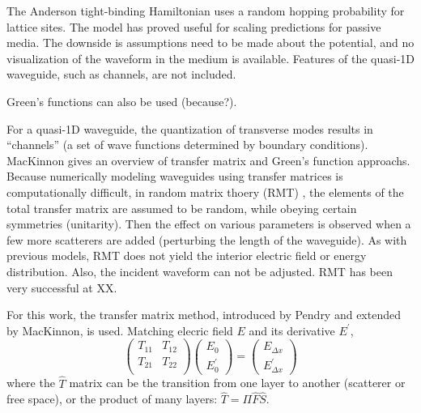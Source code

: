 The Anderson tight-binding Hamiltonian \cite{1958_Anderson} uses a random hopping probability for lattice sites. The model has proved useful for scaling predictions for passive media. The downside is assumptions need to be made about the potential, and no visualization of the waveform in the medium is available. Features of the quasi-1D waveguide, such as channels, are not included.

Green's functions can also be used (because?).

For a quasi-1D waveguide, the quantization of transverse modes results in ``channels'' (a set of wave functions determined by boundary conditions).  MacKinnon \cite{2003_Kettemann} gives an overview of transfer matrix and Green's function approachs. Because numerically modeling waveguides using transfer matrices is computationally difficult, in random matrix thoery (RMT)\cite{1951_Wigner} %
\cite{1997_Beenakker}, %
the elements of the total transfer matrix are assumed to be random, while obeying certain symmetries (unitarity). 
Then the effect on various parameters is observed when a few more scatterers are added (perturbing the length of the waveguide). As with previous models, RMT does not yield the interior electric field or energy distribution. Also, the incident waveform can not be adjusted. RMT has been very successful at XX.

For this work, the transfer matrix method, introduced by Pendry \cite{1992_Pendry} and extended by MacKinnon, is used. Matching elecric field $E$ and its derivative $E^{\prime}$,
\begin{equation}
 \left( \begin{array}{cc}
T_{11} & T_{12} \\
T_{21} & T_{22} \\
\end{array} \right)
\left( \begin{array}{c}
E_0 \\
E_0^{\prime}
\end{array} \right)
=
\left( \begin{array}{c}
E_{\Delta x} \\
E_{\Delta x}^{\prime}
\end{array} \right)
\end{equation}
where the $\hat{T}$ matrix can be the transition from one layer to another (scatterer or free space), or the product of many layers: $\hat{T} = \Pi \hat{F}\hat{S}$.

